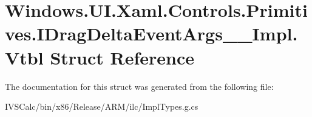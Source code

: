 \hypertarget{struct_windows_1_1_u_i_1_1_xaml_1_1_controls_1_1_primitives_1_1_i_drag_delta_event_args_____impl_1_1_vtbl}{}\section{Windows.\+U\+I.\+Xaml.\+Controls.\+Primitives.\+I\+Drag\+Delta\+Event\+Args\+\_\+\+\_\+\+Impl.\+Vtbl Struct Reference}
\label{struct_windows_1_1_u_i_1_1_xaml_1_1_controls_1_1_primitives_1_1_i_drag_delta_event_args_____impl_1_1_vtbl}


The documentation for this struct was generated from the following file\+:\begin{DoxyCompactItemize}
\item 
I\+V\+S\+Calc/bin/x86/\+Release/\+A\+R\+M/ilc/Impl\+Types.\+g.\+cs\end{DoxyCompactItemize}
